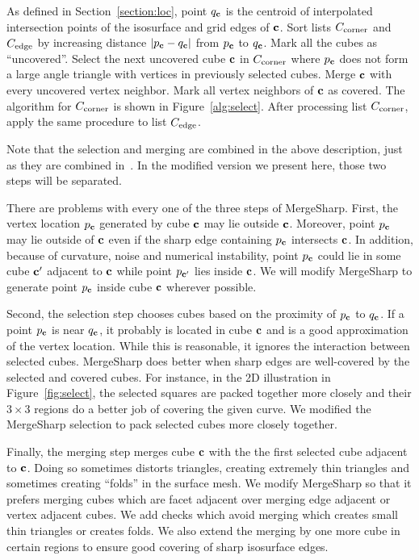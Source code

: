 As defined in Section~\ref{section:loc},
point $q_{\mathbf{c}}$ is the centroid of interpolated intersection points
of the isosurface and grid edges of $\mathbf{c}$.
Sort lists $C_{\mathrm{corner}}$ and $C_{\mathrm{edge}}$ by increasing distance $|p_{\mathbf{c}} - q_{\mathbf{c}}|$
from $p_{\mathbf{c}}$ to $q_{\mathbf{c}}$.
Mark all the cubes as ``uncovered''.
Select the next uncovered cube $\mathbf{c}$ in $C_{\mathrm{corner}}$
where $p_{\mathbf{c}}$ does not form a large angle triangle 
with vertices in previously selected cubes.
Merge $\mathbf{c}$ with every uncovered vertex neighbor.
Mark all vertex neighbors of $\mathbf{c}$ as covered.
The algorithm for $C_{\mathrm{corner}}$ is shown in Figure~\ref{alg:select}.
After processing list $C_{\mathrm{corner}}$, apply the same procedure to list $C_{\mathrm{edge}}$.

Note that the selection and merging are combined in the above description,
just as they are combined in~\cite{bw-cisec-13}.
In the modified version we present here,
those two steps will be separated.

There are problems with every one of the three steps of MergeSharp.
First, the vertex location $p_{\mathbf{c}}$ generated by cube $\mathbf{c}$
may lie outside $\mathbf{c}$.
Moreover, point $p_{\mathbf{c}}$ may lie outside of $\mathbf{c}$
even if the sharp edge containing $p_{\mathbf{c}}$ intersects $\mathbf{c}$.
In addition, because of curvature, noise and numerical instability,
point $p_{\mathbf{c}}$ could lie in some cube $\mathbf{c}'$ adjacent to $\mathbf{c}$
while point $p_{\mathbf{c}'}$ lies inside $\mathbf{c}$.
We will modify MergeSharp to generate point $p_{\mathbf{c}}$ inside cube $\mathbf{c}$
wherever possible.

Second, the selection step chooses cubes based on the proximity
of $p_{\mathbf{c}}$ to $q_{\mathbf{c}}$.
If a point $p_{\mathbf{c}}$ is near $q_{\mathbf{c}}$, 
it probably is located in cube $\mathbf{c}$ 
and is a good approximation of the vertex location.
While this is reasonable,
it ignores the interaction between selected cubes.
MergeSharp does better when sharp edges are well-covered 
by the selected and covered cubes.
For instance, in the 2D illustration in Figure~\ref{fig:select}, 
the selected squares are packed together more closely
and their $3 \times 3$ regions do a better job of covering
the given curve.
We modified the MergeSharp selection to pack selected cubes 
more closely together.

Finally, the merging step merges cube $\mathbf{c}$
with the the first selected cube adjacent to $\mathbf{c}$.
Doing so sometimes distorts triangles, creating extremely thin triangles
and sometimes creating ``folds'' in the surface mesh.
We modify MergeSharp so that it prefers merging cubes which are facet
adjacent over merging edge adjacent or vertex adjacent cubes.
We add checks which avoid merging which creates small thin triangles
or creates folds.
We also extend the merging by one more cube in certain regions
to ensure good covering of sharp isosurface edges.


